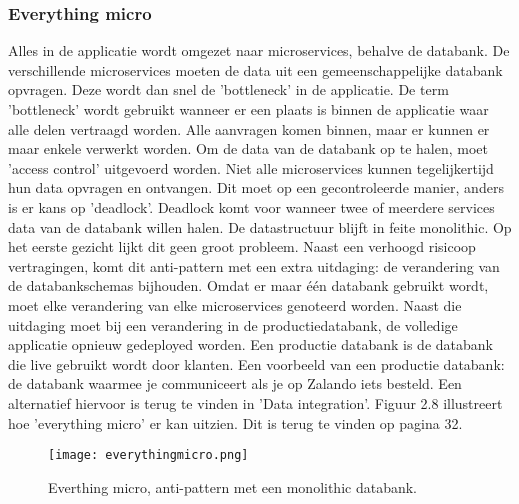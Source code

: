 \subsubsection{Everything micro}
Alles in de applicatie wordt omgezet naar microservices, behalve de databank. De verschillende microservices moeten de data uit een gemeenschappelijke databank opvragen. Deze wordt dan snel de 'bottleneck' in de applicatie. De term 'bottleneck' wordt gebruikt wanneer er een plaats is binnen de applicatie waar alle delen vertraagd worden. Alle aanvragen komen binnen, maar er kunnen er maar enkele verwerkt worden.
Om de data van de databank op te halen, moet 'access control' uitgevoerd worden. Niet alle microservices kunnen tegelijkertijd hun data opvragen en ontvangen.
Dit moet op een gecontroleerde manier, anders is er kans op 'deadlock'. Deadlock komt voor wanneer twee of meerdere services data van de databank willen halen. 
De datastructuur blijft in feite monolithic.
Op het eerste gezicht lijkt dit geen groot probleem. Naast een verhoogd risicoop vertragingen, komt dit anti-pattern met een extra uitdaging: de verandering van de databankschemas bijhouden. Omdat er maar één databank gebruikt wordt, moet elke verandering van elke microservices genoteerd worden. Naast die uitdaging moet bij een verandering in de productiedatabank, de volledige applicatie opnieuw gedeployed worden. Een productie databank is de databank die live gebruikt wordt door klanten. Een voorbeeld van een productie databank: de databank waarmee je communiceert als je op Zalando iets besteld. Een alternatief hiervoor is terug te vinden in 'Data integration'.
Figuur 2.8 illustreert hoe 'everything micro' er kan uitzien. Dit is terug te vinden op pagina 32.
\begin{figure}[h!]
	\texttt{[image: everythingmicro.png]}
	\centering
	\caption{Everthing micro, anti-pattern met een monolithic databank. \textcite{Monson2019}}
\end{figure}

